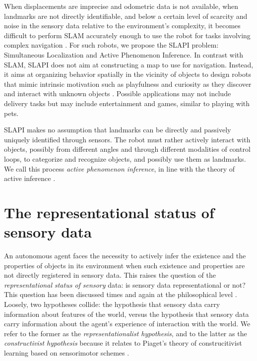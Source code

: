 \documentclass[pmlr]{jmlr}%
\begin{document}
When displacements are imprecise and odometric data is not available, when landmarks are not directly identifiable, and below a certain level of scarcity and noise in the sensory data relative to the environment’s complexity, it becomes difficult to perform SLAM accurately enough to use the robot for tasks involving complex navigation \citep{gay_towards_2021}. 
For such robots, we propose the SLAPI problem:  Simultaneous Localization and Active Phenomenon Inference.
In contrast with SLAM, SLAPI does not aim at constructing a map to use for navigation. 
Instead, it aims at organizing behavior spatially in the vicinity of objects to design robots that mimic intrinsic motivation such as playfulness and curiosity as they discover and interact with unknown objects \citep[e.g.,][]{oudeyer_intrinsic_2007}. 
Possible applications may not include delivery tasks but may include entertainment and games, similar to playing with pets. 

SLAPI makes no assumption that landmarks can be directly and passively uniquely identified through sensors. 
The robot must rather actively interact with objects, possibly from different angles and through different modalities of control loops, to categorize and recognize objects, and possibly use them as landmarks. 
We call this process \textit{active phenomenon inference}, in line with the theory of active inference \cite[e.g.,][]{friston_world_2021}. 


\section{The representational status of sensory data}
\label{sec:input}

An autonomous agent faces the necessity to actively infer the existence and the properties of objects in its environment when such existence and properties are not directly registered in sensory data. 
This raises the question of the \textit{representational status of sensory} data: is sensory data representational or not? 
This question has been discussed times and again at the philosophical level \citep[e.g.,][]{williford_husserls_2013}.
Loosely, two hypotheses collide: the hypothesis that sensory data carry information about features of the world, versus the hypothesis that sensory data carry information about the agent's experience of interaction with the world. 
We refer to the former as the \textit{representationalist hypothesis}, and to the latter as the \textit{constructivist hypothesis} because it relates to Piaget's theory of construcitivist learning based on sensorimotor schemes \citep{guillermin_artificial_2022}. 
\end{document}
